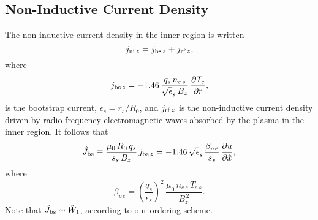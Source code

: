 \documentclass[12pt,prb,aps]{revtex4-1}
\begin{document}
\subsection{Non-Inductive Current Density}
The non-inductive current density in the inner region is
written
\begin{equation}
j_{{\rm ni}\,z} = j_{{\rm bs}\,z} + j_{{\rm rf}\,z},
\end{equation}
where 
\begin{equation}
j_{{\rm bs}\,z} = -1.46\,\frac{q_s\,n_{e\,s}}{\sqrt{\epsilon}_s\,B_z}\,\frac{\partial T_e}{\partial r},
\end{equation}
is the bootstrap current,\cite{boot,carrera,fitz} $\epsilon_s=r_s/R_0$, and $j_{{\rm rf}\,z}$ is the non-inductive current density driven by radio-frequency electromagnetic waves absorbed by the plasma in the inner region. 
It follows that
\begin{equation}
\hat{J}_{\rm bs} \equiv \frac{\mu_0\,R_0\,q_s}{s_s\,B_z}\,j_{{\rm bs}\,z} = - 1.46\,\sqrt{\epsilon}_s\,\frac{\beta_{p\,e}}{s_s}\,\frac{\partial u}{\partial \hat{x}},
\end{equation}
where 
\begin{equation}
\beta_{p\,e} = \left(\frac{q_s}{\epsilon_s}\right)^2\,\frac{\mu_0\,n_{e\,s}\,T_{e\,s}}{B_z^{\,2}}.
\end{equation}
Note that $\hat{J}_{\rm bs}\sim \hat{W}_1$, according to our ordering scheme.
\end{document}
